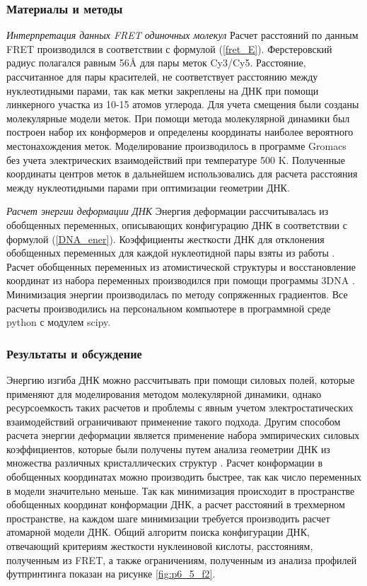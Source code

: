 \subsubsection{Материалы и методы}
\emph{Интерпретация данных FRET одиночных молекул}
Расчет расстояний по данным FRET производился в соответствии с формулой (\ref{fret_E}). Ферстеровский радиус полагался равным 56\AA{} для пары меток Cy3/Cy5.
 Расстояние, рассчитанное для пары красителей, не соответствует расстоянию между нуклеотидными парами, так как метки закреплены на ДНК при помощи линкерного участка из 10-15 атомов углерода. Для учета смещения были созданы молекулярные модели меток. При помощи метода молекулярной динамики был построен набор их конформеров и определены координаты наиболее вероятного местонахождения меток. Моделирование производилось в программе Gromacs  \cite{abraham_gromacs:_2015} без учета электрических взаимодействий при температуре 500 K. Полученные координаты центров меток в дальнейшем использовались для расчета расстояния между нуклеотидными парами при оптимизации геометрии ДНК.

\emph{Расчет энергии деформации ДНК}
Энергия деформации рассчитывалась из обобщенных переменных, описывающих конфигурацию ДНК в соответствии с формулой (\ref{DNA_ener}). 
Коэффициенты жесткости ДНК для отклонения обобщенных переменных для каждой нуклеотидной пары взяты из работы \cite{olson_dna_1998}. Расчет обобщенных переменных из атомистической структуры и восстановление координат из набора переменных производился при помощи программы 3DNA \cite{lu_3dna_2003}. Минимизация энергии производилась по методу сопряженных градиентов. 
Все расчеты производились на персональном компьютере в программной среде python  с модулем scipy.

\subsubsection{Результаты и обсуждение}
Энергию изгиба ДНК можно рассчитывать при помощи силовых полей, которые применяют для моделирования методом молекулярной динамики, однако ресурсоемкость таких расчетов и проблемы с явным учетом электростатических взаимодействий ограничивают применение такого подхода. Другим способом расчета энергии деформации является применение набора эмпирических силовых коэффициентов, которые были получены путем анализа геометрии ДНК из множества различных кристаллических структур \cite{olson_dna_1998}.  Расчет конформации в обобщенных координатах можно производить быстрее, так как число переменных в модели значительно меньше. 
Так как минимизация происходит в пространстве обобщенных координат конформации ДНК, а расчет расстояний в трехмерном пространстве, на каждом шаге минимизации требуется производить расчет атомарной модели ДНК. Общий алгоритм поиска конфигурации ДНК, отвечающий критериям жесткости нуклеиновой кислоты, расстояниям, полученным из FRET, а также ограничениям, полученным из анализа профилей футпринтинга показан на рисунке \ref{fig:p6_5_f2}.

